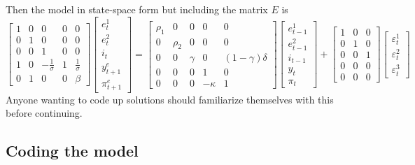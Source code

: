 \documentclass[
  letterpaper,
]{book}
\begin{document}
Then the model in state-space form but including the matrix \(E\) is \[
\begin{bmatrix} 1 & 0 & 0 & 0 & 0 \\ 
                0 & 1 & 0 & 0 & 0 \\ 
                0 & 0 & 1 & 0 & 0 \\ 
                1 & 0 & -\frac{1}{\sigma} & 1 & \frac{1}{\sigma} \\ 
                0 & 1 & 0 & 0 & \beta
\end{bmatrix}
\begin{bmatrix} e^1_t \\ e^2_t \\ i_t \\ y^e_{t+1} \\ \pi^e_{t+1} \end{bmatrix} 
   = 
   \begin{bmatrix} \rho_1 & 0 & 0 & 0 & 0 \\ 
                0 & \rho_2 & 0 & 0 & 0 \\ 
                0 & 0 & \gamma & 0 & (1-\gamma)\delta \\ 
                0 & 0 & 0 & 1 & 0 \\ 
                0 & 0 & 0 & -\kappa & 1
   \end{bmatrix}
\begin{bmatrix} e^1_{t-1} \\ e^2_{t-1} \\ i_{t-1} \\ y_t \\ \pi_t \end{bmatrix}    
   + 
      \begin{bmatrix} 
                1 & 0 & 0  \\ 
                0 & 1 & 0 \\ 
                0 & 0 & 1 \\ 
                0 & 0 & 0 \\ 
                0 & 0 & 0 
   \end{bmatrix}
   \begin{bmatrix} \varepsilon^1_t \\ \varepsilon^2_t \\ \varepsilon^3_t \end{bmatrix}    
\] Anyone wanting to code up solutions should familiarize themselves
with this before continuing.

\hypertarget{coding-the-model}{%
\subsection{Coding the model}\label{coding-the-model}}
\end{document}
